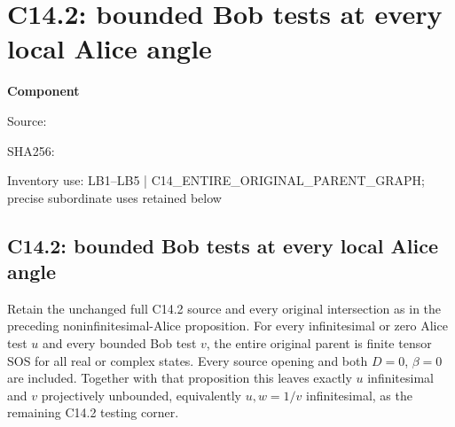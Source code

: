 \chapter{C14.2: bounded Bob tests at every local Alice angle}
\label{component:pda4a21937f64}
\noindent\textbf{Component }\par
{\small\noindent Source: \par}
{\small\noindent SHA256: \par}
{\small\noindent Inventory use: LB1--LB5 | C14\_\allowbreak{}ENTIRE\_\allowbreak{}ORIGINAL\_\allowbreak{}PARENT\_\allowbreak{}GRAPH; precise subordinate uses retained below\par}
\medskip
\section{C14.2: bounded Bob tests at every local Alice angle}
\label{pda4a21937f64:sec:r18-c142-bounded-bob}

\begin{proposition}
Retain the unchanged full C14.2 source and every original intersection
as in the preceding noninfinitesimal-Alice proposition.  For every
infinitesimal or zero Alice test $u$ and every bounded Bob test $v$,
the entire original parent is finite tensor SOS for all real or
complex states.  Every source opening and both $D=0$, $\beta=0$
are included.  Together with that proposition this leaves exactly
$u$ infinitesimal and $v$ projectively unbounded, equivalently
$u,w=1/v$ infinitesimal, as the remaining C14.2 testing corner.
\end{proposition}


